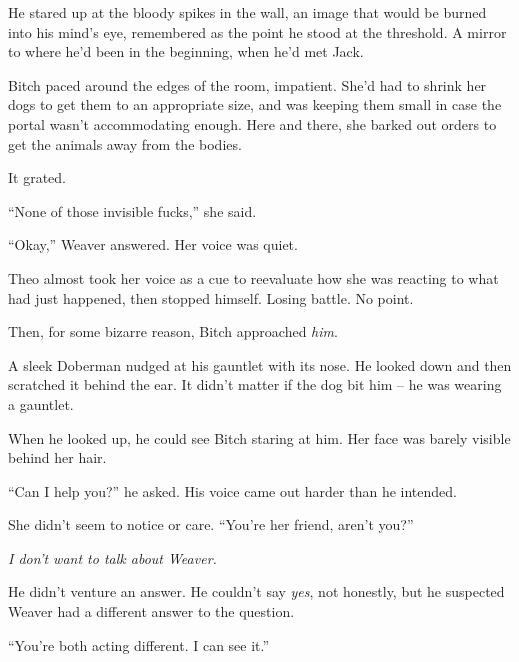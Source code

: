 He stared up at the bloody spikes in the wall, an image that would be burned into his mind's eye, remembered as the point he stood at the threshold.  A mirror to where he'd been in the beginning, when he'd met Jack.



Bitch paced around the edges of the room, impatient.  She'd had to shrink her dogs to get them to an appropriate size, and was keeping them small in case the portal wasn't accommodating enough.  Here and there, she barked out orders to get the animals away from the bodies.



It grated.



``None of those invisible fucks,'' she said.



``Okay,'' Weaver answered.  Her voice was quiet.



Theo almost took her voice as a cue to reevaluate how she was reacting to what had just happened, then stopped himself.  Losing battle.  No point.



Then, for some bizarre reason, Bitch approached \emph{him}.



A sleek Doberman nudged at his gauntlet with its nose.  He looked down and then scratched it behind the ear.  It didn't matter if the dog bit him – he was wearing a gauntlet.



When he looked up, he could see Bitch staring at him.  Her face was barely visible behind her hair.



``Can I help you?'' he asked.  His voice came out harder than he intended.



She didn't seem to notice or care.  ``You're her friend, aren't you?''



\emph{I don't want to talk about Weaver.}



He didn't venture an answer.  He couldn't say \emph{yes}, not honestly, but he suspected Weaver had a different answer to the question.



``You're both acting different.  I can see it.''



